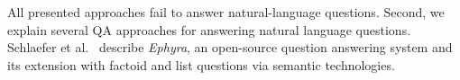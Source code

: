 All presented approaches fail to answer natural-language questions.
Second, we explain several QA approaches for answering natural language questions.
{Schlaefer et al.~\cite{ephyra2007}} describe \emph{Ephyra}, an open-source question answering system and its extension with factoid and list questions via semantic technologies.
